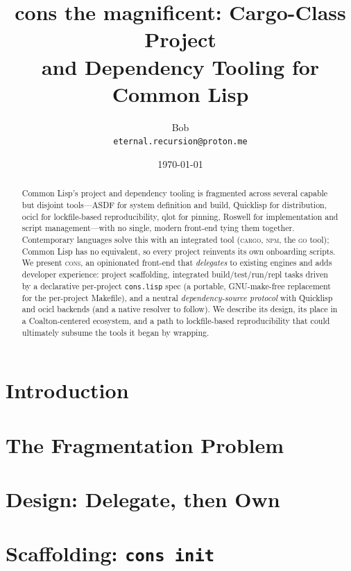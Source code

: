 \documentclass[11pt,a4paper]{article}
\title{\textbf{cons the magnificent}: Cargo-Class Project\\
       and Dependency Tooling for Common Lisp}
\author{Bob\\ \small\texttt{eternal.recursion@proton.me}}
\date{\today}
\begin{document}
\maketitle

\begin{abstract}
Common Lisp's project and dependency tooling is fragmented across several capable
but disjoint tools---ASDF for system definition and build, Quicklisp for
distribution, ocicl for lockfile-based reproducibility, qlot for pinning, Roswell
for implementation and script management---with no single, modern front-end tying
them together. Contemporary languages solve this with an integrated tool
(\textsc{cargo}, \textsc{npm}, the \textsc{go} tool); Common Lisp has no
equivalent, so every project reinvents its own onboarding scripts. We present
\textsc{cons}, an opinionated front-end that \emph{delegates} to existing engines
and adds developer experience: project scaffolding, integrated build/test/run/repl
tasks driven by a declarative per-project \texttt{cons.lisp} spec (a portable,
GNU-make-free replacement for the per-project Makefile), and a neutral
\emph{dependency-source protocol} with Quicklisp and ocicl backends (and a native
resolver to follow). We describe its design, its place in a Coalton-centered
ecosystem, and a path to lockfile-based reproducibility that could ultimately subsume
the tools it began by wrapping.
\end{abstract}

\section{Introduction}
\label{sec:intro}

\section{The Fragmentation Problem}
\label{sec:frag}

\section{Design: Delegate, then Own}
\label{sec:design}

\section{Scaffolding: \texttt{cons init}}
\label{sec:new}
\end{document}
